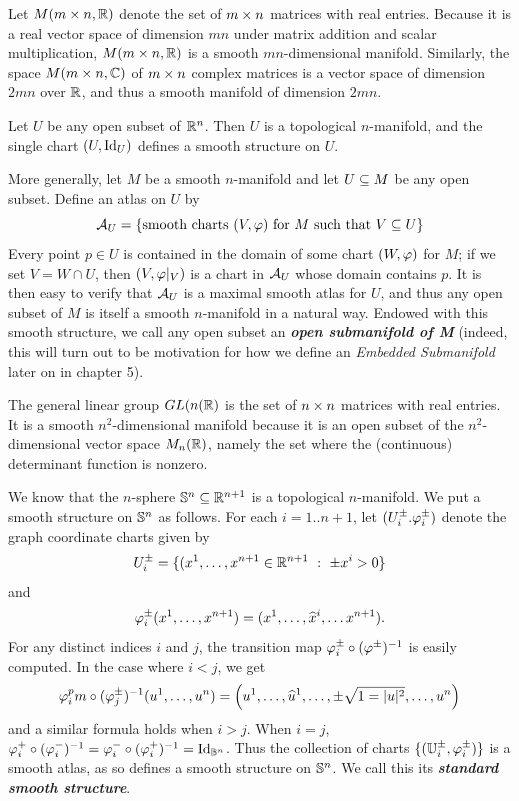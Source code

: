 \setcounter{thm}{24}

\begin{ex}
Let $M(m\times n, \mathbb{R})$ denote the set of $m\times n$ matrices with real entries. Because it is a real vector space of dimension $mn$ under matrix addition and scalar multiplication, $M(m\times n, \mathbb{R})$ is a smooth $mn$-dimensional manifold. Similarly, the space $M(m\times n, \mathbb{C})$ of $m\times n$ complex matrices is a vector space of dimension $2mn$ over $\mathbb{R}$, and thus a smooth manifold of dimension $2mn$.
\end{ex}

\begin{ex}
Let $U$ be any open subset of $\mathbb{R}^n$. Then $U$ is a topological $n$-manifold, and the single chart $(U, \text{Id}_U)$ defines a smooth structure on $U$.

More generally, let $M$ be a smooth $n$-manifold and let $U\subseteq M$ be any open subset. Define an atlas on $U$ by
\[\mathcal{A}_U = \{\text{smooth charts $(V, \varphi)$ for $M$ such that $V\subseteq U$}\}\]
Every point $p\in U$ is contained in the domain of some chart $(W, \varphi)$ for $M$; if we set $V = W\cap U$, then $(V,\varphi|_V)$ is a chart in $\mathcal{A}_U$ whose domain contains $p$. It is then easy to verify that $\mathcal{A}_U$ is a maximal smooth atlas for $U$, and thus any open subset of $M$ is itself a smooth $n$-manifold in a natural way. Endowed with this smooth structure, we call any open subset an \textbf{\textit{open submanifold of M}} (indeed, this will turn out to be motivation for how we define an \textit{Embedded Submanifold} later on in chapter 5).
\end{ex}

\begin{ex}
The general linear group $GL(n(\mathbb{R})$ is the set of $n\times n$ matrices with real entries. It is a smooth $n^2$-dimensional manifold because it is an open subset of the $n^2$-dimensional vector space $M_n(\mathbb{R})$, namely the set where the (continuous) determinant function is nonzero.
\end{ex}

\setcounter{thm}{30}

\begin{ex}[Spheres]
We know that the $n$-sphere $\mathbb{S}^n\subseteq \mathbb{R}^{n + 1}$ is a topological $n$-manifold. We put a smooth structure on $\mathbb{S}^n$ as follows. For each $i = 1..n + 1$, let $(U_i^\pm. \varphi_i^\pm)$ denote the graph coordinate charts given by 
\[U_i^\pm = \{(x^1, \ldots, x^{n + 1}\in \mathbb{R}^{n + 1}\ :\ \pm x^i > 0\}\]
and 
\[\varphi_i^\pm (x^1,\ldots,x^{n + 1}) = (x^1,\ldots,\widehat x^i,\ldots x^{n + 1}).\]
For any distinct indices $i$ and $j$, the transition map $\varphi_i^\pm\circ(\varphi^\pm)^{-1}$ is easily computed. In the case where $i < j$, we get 
\[\varphi_i^pm\circ(\varphi_j^\pm)^{-1}(u^1, \ldots, u^n) = \left( u^1,\ldots,\widehat u^1,\ldots,\pm\sqrt{1 = |u|^2},\ldots,u^n\right)\]
and a similar formula holds when $i > j$. When $i = j$, $\varphi_i^+\circ(\varphi_i^-)^{-1} = \varphi_i^-\circ (\varphi_i^+)^{-1} = \text{Id}_{\mathbb{B}^n}$. Thus the collection of charts $\{(\mathbb{U}_i^\pm, \varphi_i^\pm)\}$ is a smooth atlas, as so defines a smooth structure on $\mathbb{S}^n$. We call this its \textbf{\textit{standard smooth structure}}.
\end{ex}

